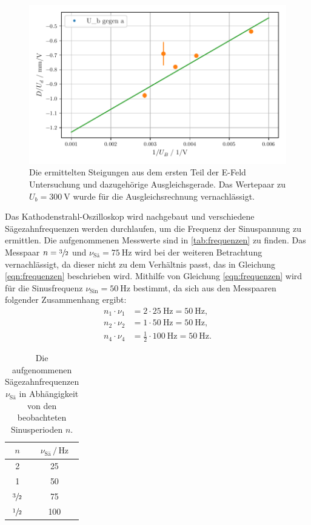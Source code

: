 \begin{figure}[H]
    \centering
    \includegraphics[width=\textwidth]{bilder/E_Feld_Teil_1_2.pdf}
    \caption{Die ermittelten Steigungen aus dem ersten Teil der E-Feld Untersuchung und dazugehörige Ausgleichsgerade.
    Das Wertepaar zu $U_b = \SI{300}{\volt}$ wurde für die Ausgleichsrechnung vernachlässigt.}
    \label{fig:eFeldTeil1b}
\end{figure}
\noindent
Das Kathodenstrahl-Oszilloskop wird nachgebaut und verschiedene Sägezahnfrequenzen werden durchlaufen, um die Frequenz der Sinuspannung zu ermittlen.
Die aufgenommenen Messwerte sind in \autoref{tab:frequenzen} zu finden.
Das Messpaar $n = \sfrac{3}{2}$ und $\nu_\text{Sä} = \SI{75}{\hertz}$ wird bei der weiteren Betrachtung vernachlässigt, da dieser nicht zu dem Verhältnis passt, das in Gleichung \eqref{eqn:frequenzen} beschrieben wird.
Mithilfe von Gleichung \eqref{eqn:frequenzen} wird für die Sinusfrequenz $\nu_\text{Sin} = \SI{50}{\hertz}$ bestimmt, da sich aus den Messpaaren folgender Zusammenhang ergibt:
\begin{align*}
    n_1 \cdot \nu_1 &= 2 \cdot \SI{25}{\hertz} = \SI{50}{\hertz}, \\
    n_2 \cdot \nu_2 &= 1 \cdot \SI{50}{\hertz} = \SI{50}{\hertz}, \\
    n_4 \cdot \nu_4 &=  \frac{1}{2} \cdot \SI{100}{\hertz} = \SI{50}{\hertz}.
\end{align*}

\begin{table}[H]
    \centering
    \caption{Die aufgenommenen Sägezahnfrequenzen $\nu_\text{Sä}$ in Abhängigkeit von den beobachteten Sinusperioden $n$. } 
    \label{tab:frequenzen}
    \begin{tabular}{S[table-format=3] S[table-format=2]}
    \toprule
    $n$ & $\nu_\text{Sä} \, / \,\si{\hertz}$\\
       & 25 \\
      1 & 50 \\
      $\sfrac{3}{2}$ & 75 \\
      $\sfrac{1}{2}$ & 100 \\
      \bottomrule
    \end{tabular}
  \end{table}

